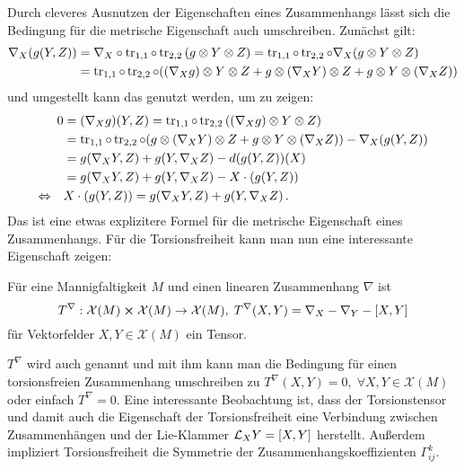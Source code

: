 \documentclass[../H_Analysis_main.tex]{subfiles}
\begin{document}
Durch cleveres Ausnutzen der Eigenschaften eines Zusammenhangs lässt sich die Bedingung für die metrische Eigenschaft auch umschreiben. Zunächst gilt:
\begin{align*}
\nabla_X \qty(g(Y, Z)) &= \nabla_X \circ \tr_{1, 1} \circ \tr_{2, 2} \qty(g \otimes Y \otimes Z) = \tr_{1, 1} \circ \tr_{2, 2} \circ \nabla_X \qty(g \otimes Y \otimes Z) 
\\
&= \tr_{1, 1} \circ \tr_{2, 2} \circ \qty(\qty(\nabla_X g) \otimes Y \otimes Z + g \otimes \qty(\nabla_X Y) \otimes Z + g \otimes Y \otimes \qty(\nabla_X Z))
\end{align*}
und umgestellt kann das genutzt werden, um zu zeigen:
\begin{align}
0 &= \qty(\nabla_X g)(Y, Z) = \tr_{1, 1} \circ \tr_{2, 2} \qty(\qty(\nabla_X g) \otimes Y \otimes Z)
\notag\\
&= \tr_{1, 1} \circ \tr_{2, 2} \circ \qty(g \otimes \qty(\nabla_X Y) \otimes Z + g \otimes Y \otimes \qty(\nabla_X Z)) - \nabla_X \qty(g(Y, Z))
\notag\\
&= g\qty(\nabla_X Y, Z) + g\qty(Y, \nabla_X Z) - d \qty(g(Y, Z))(X)
\notag\\
&= g\qty(\nabla_X Y, Z) + g\qty(Y, \nabla_X Z) - X \cdot \qty(g(Y, Z))
\notag\\
\Leftrightarrow \quad & X \cdot \qty(g(Y, Z)) = g\qty(\nabla_X Y, Z) + g\qty(Y, \nabla_X Z) \, .
\end{align}
Das ist eine etwas explizitere Formel für die metrische Eigenschaft eines Zusammenhangs. Für die Torsionsfreiheit kann man nun eine interessante Eigenschaft zeigen:
\begin{lemma}[Torsionstensor]
Für eine Mannigfaltigkeit $M$ und einen linearen Zusammenhang $\nabla$ ist
\begin{equation}
T^\nabla: \mathcal{X}(M) \cross \mathcal{X}(M) \rightarrow \mathcal{X}(M), \; T^\nabla(X, Y) = \nabla_X - \nabla_Y - \qty[X, Y]
\end{equation}
für Vektorfelder $X, Y \in \mathcal{X}(M)$ ein Tensor.
\end{lemma}
$T^\nabla$ wird auch  genannt und mit ihm kann man die Bedingung für einen torsionsfreien Zusammenhang umschreiben zu $T^\nabla(X, Y) = 0, \; \forall X, Y \in \mathcal{X}(M)$ oder einfach $T^\nabla = 0$. Eine interessante Beobachtung ist, dass der Torsionstensor und damit auch die Eigenschaft der Torsionsfreiheit eine Verbindung zwischen Zusammenhängen und der Lie-Klammer $\mathcal{L}_X Y = \qty[X, Y]$ herstellt. Außerdem impliziert Torsionsfreiheit die Symmetrie der Zusammenhangskoeffizienten $\Gamma_{ij}^k$.\\
\end{document}
